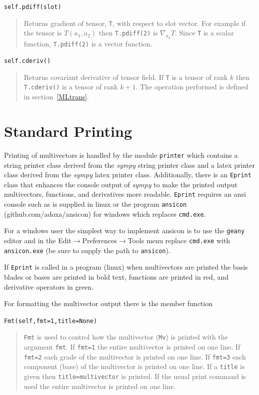 \documentclass[12pt]{report}
\newcommand{\lp}{\left (}
\newcommand{\rp}{\right )}
\newcommand{\f}[2]{{#1}\lp {#2} \rp}
\newcommand{\T}[1]{\texttt{#1}}
\begin{document}
\T{self.pdiff(slot)}
\begin{quote}
	Returns gradient of tensor, \T{T}, with respect to slot vector.  For example if the tensor is $\f{T}{a_{1},a_{2}}$ then
	\T{T.pdiff(2)} is $\nabla_{a_{2}}T$.  Since \T{T} is a scalar function, \T{T.pdiff(2)} is a vector function.
\end{quote}

\T{self.cderiv()}
\begin{quote}
	Returns covariant derivative of tensor field. If \T{T} is a tensor of rank $k$ then \T{T.cderiv()} is a tensor of rank $k+1$.
	The operation performed is defined in section~\ref{MLtrans}.
\end{quote}

\section{Standard Printing}

Printing of multivectors is handled by the module \T{printer} which contains
a string printer class derived from the \emph{sympy} string printer class and a latex
printer class derived from the \emph{sympy} latex printer class.  Additionally, there
is an \T{Eprint} class that enhances the console output of \emph{sympy} to make
the printed output multivectors, functions, and derivatives more readable.
\T{Eprint} requires an ansi console such as is supplied in linux or the
program \T{ansicon} (github.com/adoxa/ansicon) for windows which replaces \T{cmd.exe}.

For a windows user the simplest way to implement ansicon is to use the \T{geany}
editor and in the Edit$\rightarrow$Preferences$\rightarrow$Tools menu replace \T{cmd.exe} with
\T{ansicon.exe} (be sure to supply the path to \T{ansicon}).

If \T{Eprint} is called in a program (linux) when multivectors are printed
the basis blades or bases are printed in bold text, functions are printed in red,
and derivative operators in green.

For formatting the multivector output there is the member function

\T{Fmt(self,fmt=1,title=None)}
\begin{quote}
\T{Fmt} is used to control how the multivector (\T{Mv}) is printed with the argument
\T{fmt}.  If \T{fmt=1} the entire multivector is printed on one line.  If
\T{fmt=2} each grade of the multivector is printed on one line.  If \T{fmt=3}
each component (base) of the multivector is printed on one line.  If a
\T{title} is given then \T{title=multivector} is printed.  If the usual print
command is used the entire multivector is printed on one line.
\end{quote}
\end{document}
